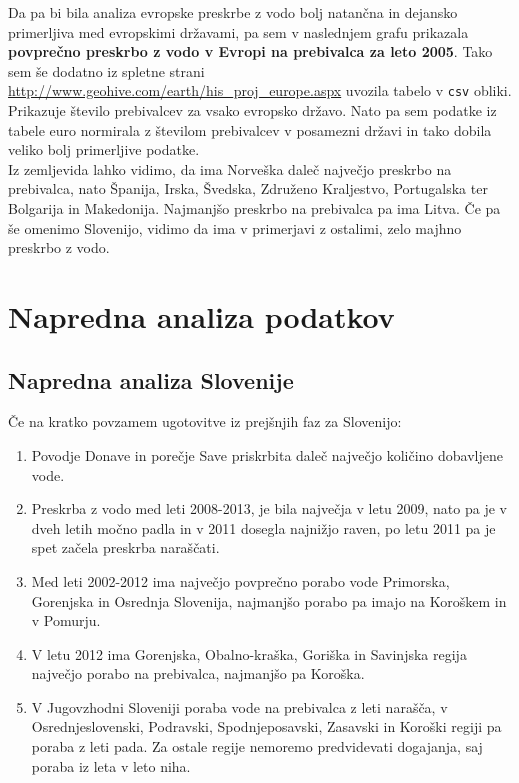 \documentclass[11pt,a4paper]{article}
\begin{document}

\newpage

Da pa bi bila analiza evropske preskrbe z vodo bolj natančna in dejansko primerljiva med evropskimi državami, pa sem v naslednjem grafu prikazala \textbf{povprečno preskrbo z vodo v Evropi na prebivalca za leto 2005}. Tako sem še dodatno iz spletne strani \url{http://www.geohive.com/earth/his_proj_europe.aspx} uvozila tabelo v \verb|csv| obliki. Prikazuje število prebivalcev za vsako evropsko državo. Nato pa sem podatke iz tabele euro normirala z številom prebivalcev v posamezni državi in tako dobila veliko bolj primerljive podatke.\\

Iz zemljevida lahko vidimo, da ima Norveška daleč največjo preskrbo na prebivalca, nato Španija, Irska, Švedska, Združeno Kraljestvo, Portugalska ter Bolgarija in Makedonija. Najmanjšo preskrbo na prebivalca pa ima Litva.
Če pa še omenimo Slovenijo, vidimo da ima v primerjavi z ostalimi, zelo majhno preskrbo z vodo.


\newpage

\section{Napredna analiza podatkov}
\subsection{Napredna analiza Slovenije}

Če na kratko povzamem ugotovitve iz prejšnjih faz za Slovenijo:
\begin{enumerate} 
\item{Povodje Donave in porečje Save priskrbita daleč največjo količino dobavljene vode.}
\item{Preskrba z vodo med leti 2008-2013, je bila največja v letu 2009, nato pa je v dveh letih močno padla in v 2011 dosegla najnižjo raven, po letu 2011 pa je spet začela preskrba naraščati.}
\item{Med leti 2002-2012 ima največjo povprečno porabo vode Primorska, Gorenjska in Osrednja Slovenija, najmanjšo porabo pa imajo na Koroškem in v Pomurju.}
\item{V letu 2012 ima Gorenjska, Obalno-kraška, Goriška in Savinjska regija največjo porabo na prebivalca, najmanjšo pa Koroška.}
\item{V Jugovzhodni Sloveniji poraba vode na prebivalca z leti narašča, v Osrednjeslovenski, Podravski, Spodnjeposavski, Zasavski in Koroški regiji pa poraba z leti pada. Za ostale regije nemoremo predvidevati dogajanja, saj poraba iz leta v leto niha.}
\end{enumerate}
\end{document}
